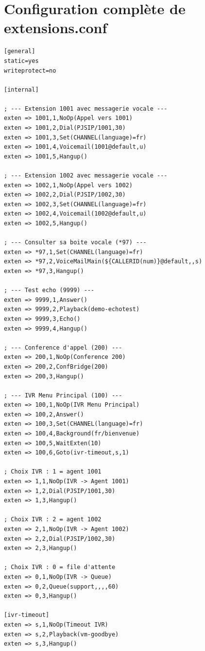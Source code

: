 \documentclass[a4paper,11pt]{report}
\begin{document}
\section{Configuration complète de extensions.conf}

\begin{codebox}
\begin{lstlisting}
[general]
static=yes
writeprotect=no

[internal]

; --- Extension 1001 avec messagerie vocale ---
exten => 1001,1,NoOp(Appel vers 1001)
exten => 1001,2,Dial(PJSIP/1001,30)
exten => 1001,3,Set(CHANNEL(language)=fr)
exten => 1001,4,Voicemail(1001@default,u)
exten => 1001,5,Hangup()

; --- Extension 1002 avec messagerie vocale ---
exten => 1002,1,NoOp(Appel vers 1002)
exten => 1002,2,Dial(PJSIP/1002,30)
exten => 1002,3,Set(CHANNEL(language)=fr)
exten => 1002,4,Voicemail(1002@default,u)
exten => 1002,5,Hangup()

; --- Consulter sa boite vocale (*97) ---
exten => *97,1,Set(CHANNEL(language)=fr)
exten => *97,2,VoiceMailMain(${CALLERID(num)}@default,,s)
exten => *97,3,Hangup()

; --- Test echo (9999) ---
exten => 9999,1,Answer()
exten => 9999,2,Playback(demo-echotest)
exten => 9999,3,Echo()
exten => 9999,4,Hangup()

; --- Conference d'appel (200) ---
exten => 200,1,NoOp(Conference 200)
exten => 200,2,ConfBridge(200)
exten => 200,3,Hangup()

; --- IVR Menu Principal (100) ---
exten => 100,1,NoOp(IVR Menu Principal)
exten => 100,2,Answer()
exten => 100,3,Set(CHANNEL(language)=fr)
exten => 100,4,Background(fr/bienvenue)
exten => 100,5,WaitExten(10)
exten => 100,6,Goto(ivr-timeout,s,1)

; Choix IVR : 1 = agent 1001
exten => 1,1,NoOp(IVR -> Agent 1001)
exten => 1,2,Dial(PJSIP/1001,30)
exten => 1,3,Hangup()

; Choix IVR : 2 = agent 1002
exten => 2,1,NoOp(IVR -> Agent 1002)
exten => 2,2,Dial(PJSIP/1002,30)
exten => 2,3,Hangup()

; Choix IVR : 0 = file d'attente
exten => 0,1,NoOp(IVR -> Queue)
exten => 0,2,Queue(support,,,,60)
exten => 0,3,Hangup()

[ivr-timeout]
exten => s,1,NoOp(Timeout IVR)
exten => s,2,Playback(vm-goodbye)
exten => s,3,Hangup()
\end{lstlisting}
\end{codebox}
\end{document}
